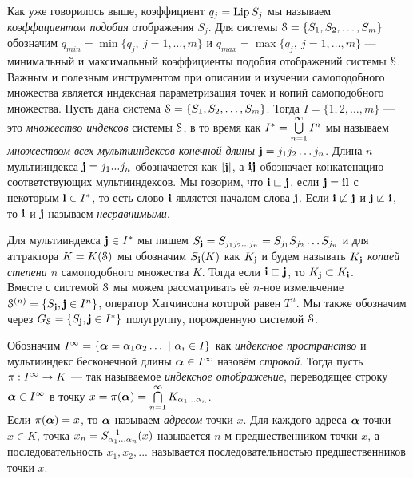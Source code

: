 Как уже говорилось выше, коэффициент $q_j=\mathop{\rm Lip} \nolimits S_j$ мы называем {\em коэффициентом подобия} отображения $S_j$.
Для системы ${\EuScript S}=\{S_1, S_2, \ldots, S_m\}$ обозначим $q_{min}=\min\{q_j,\ j=1,\ldots,m\}$ и $q_{max}=\max\{q_j,\ j=1,\ldots,m\}$ --- минимальный и максимальный коэффициенты подобия отображений системы ${\EuScript S}$.\\

Важным и полезным инструментом при описании и изучении самоподобного множества является индексная параметризация точек и копий самоподобного множества.
Пусть дана система ${\EuScript S}=\{S_1, S_2, \ldots, S_m\}$.
Тогда $I=\{1,2,\ldots,m\}$ --- это {\em множество индексов} системы ${\EuScript S}$, в то время как $I^*=\bigcup\limits_{n=1}^\infty I^n$ мы называем {\em множеством всех мультииндексов конечной длины} ${\bf{j}}=j_1 j_2 \ldots j_n$.
Длина $n$ мультииндекса ${\bf{j}}=j_1...j_n$ обозначается как $|{\bf{j}}|$, а ${\bf{i}}{\bf{j}}$ обозначает конкатенацию соответствующих мультииндексов. 
Мы говорим, что ${\bf{i}}\sqsubset{\bf{j}}$, если  ${\bf{j}}={\bf{i}}{\bf{l}}$ с некоторым ${\bf{l}}\in I^*$, то есть слово ${\bf{i}}$ является началом слова ${\bf{j}}$. 
Если ${\bf{i}}\not\sqsubset{\bf{j}}$ и ${\bf{j}}\not\sqsubset{\bf{i}}$, то ${\bf{i}}$ и ${\bf{j}}$ называем {\em несравнимыми}.

Для мультииндекса ${\bf{j}}\in I^*$ мы пишем $S_{\bf{j}}=S_{j_1j_2\ldots j_n}=S_{j_1}S_{j_2}\ldots S_{j_n}$ и для аттрактора $K=K({\EuScript S})$ мы обозначим $S_{\bf{j}}(K)$ как $K_{\bf{j}}$ и будем называть $K_{\bf{j}}$ {\em копией степени $n$} самоподобного множества $K$.
Тогда если ${\bf{i}}\sqsubset{\bf{j}}$, то $K_{\bf{j}}\subset K_{\bf{i}}$.\\

Вместе с системой ${\EuScript S}$ мы можем рассматривать её $n$-ное измельчение ${\EuScript S}^{(n)}=\{S_{\bf{j}}, {\bf{j}}\in I^n\}$, оператор Хатчинсона которой равен $T^n$.
Мы также обозначим через $G_{\EuScript S}=\{S_{\bf{j}}, {\bf{j}}\in I^*\}$ полугруппу, порожденную системой ${\EuScript S}$. 

Обозначим $I^{\infty}=\{{{\bm{\alpha}}}=\alpha_1\alpha_2\ldots\ |\ \alpha_i\in I\}$ как {\em индексное пространство} и мультииндекс бесконечной длины ${\bm{\alpha}}\in I^{\infty}$ назовём {\em строкой}.
Тогда пусть $\pi:I^{\infty}\rightarrow K$ --- так называемое {\em индексное отображение}, переводящее строку ${\bm{\alpha}}\in I^{\infty}$ в точку $x=\pi({\bm{\alpha}})=\bigcap\limits_{n=1}^\infty K_{\alpha_1\ldots\alpha_n}$.\\
Если $\pi({\bm{\alpha}})=x$, то ${\bm{\alpha}}$ называем {\em адресом} точки $x$. 
Для каждого адреса ${\bm{\alpha}}$ точки $x\in K$, точка $x_n=S_{\alpha_1...\alpha_n}^{-1}(x)$ называется $n$-м предшественником точки $x$, а последовательность $x_1, x_2,...$ называется последовательностью предшественников точки $x$.



